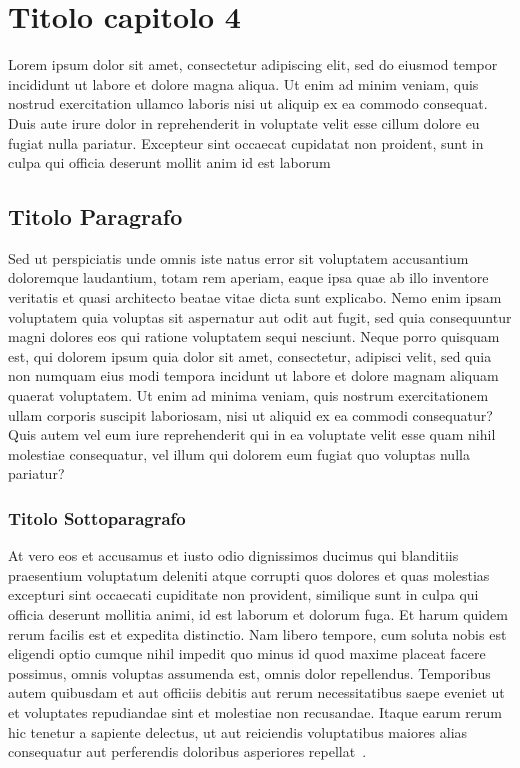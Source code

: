 \documentclass[a4paper,twoside,12pt]{toptesi}
\begin{document}
\chapter{Titolo capitolo 4}
Lorem ipsum dolor sit amet, consectetur adipiscing elit, sed do eiusmod tempor incididunt ut labore et dolore magna aliqua. Ut enim ad minim veniam, quis nostrud exercitation ullamco laboris nisi ut aliquip ex ea commodo consequat. Duis aute irure dolor in reprehenderit in voluptate velit esse cillum dolore eu fugiat nulla pariatur. Excepteur sint occaecat cupidatat non proident, sunt in culpa qui officia deserunt mollit anim id est laborum

\section{Titolo Paragrafo}
Sed ut perspiciatis unde omnis iste natus error sit voluptatem accusantium doloremque laudantium, totam rem aperiam, eaque ipsa quae ab illo inventore veritatis et quasi architecto beatae vitae dicta sunt explicabo. Nemo enim ipsam voluptatem quia voluptas sit aspernatur aut odit aut fugit, sed quia consequuntur magni dolores eos qui ratione voluptatem sequi nesciunt. Neque porro quisquam est, qui dolorem ipsum quia dolor sit amet, consectetur, adipisci velit, sed quia non numquam eius modi tempora incidunt ut labore et dolore magnam aliquam quaerat voluptatem. Ut enim ad minima veniam, quis nostrum exercitationem ullam corporis suscipit laboriosam, nisi ut aliquid ex ea commodi consequatur? Quis autem vel eum iure reprehenderit qui in ea voluptate velit esse quam nihil molestiae consequatur, vel illum qui dolorem eum fugiat quo voluptas nulla pariatur?

\subsection{Titolo Sottoparagrafo}
At vero eos et accusamus et iusto odio dignissimos ducimus qui blanditiis praesentium voluptatum deleniti atque corrupti quos dolores et quas molestias excepturi sint occaecati cupiditate non provident, similique sunt in culpa qui officia deserunt mollitia animi, id est laborum et dolorum fuga. Et harum quidem rerum facilis est et expedita distinctio. Nam libero tempore, cum soluta nobis est eligendi optio cumque nihil impedit quo minus id quod maxime placeat facere possimus, omnis voluptas assumenda est, omnis dolor repellendus. Temporibus autem quibusdam et aut officiis debitis aut rerum necessitatibus saepe eveniet ut et voluptates repudiandae sint et molestiae non recusandae. Itaque earum rerum hic tenetur a sapiente delectus, ut aut reiciendis voluptatibus maiores alias consequatur aut perferendis doloribus asperiores repellat~\cite{libro1}.
\end{document}

